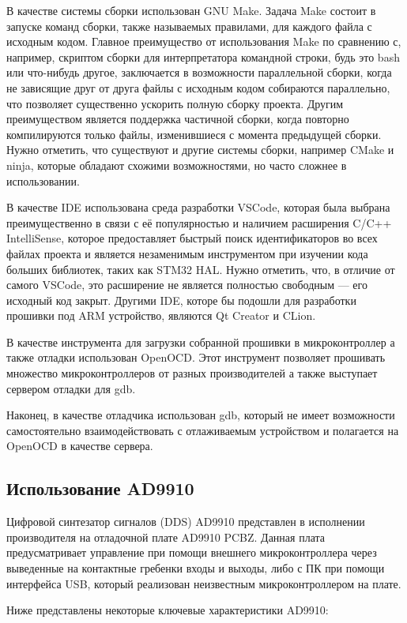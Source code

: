 \documentclass[rusmathsym, eqnumwithinsec, amspack, hyperref]{bomgost}
\begin{document}
В качестве системы сборки использован GNU Make. Задача Make состоит в запуске команд сборки, также называемых правилами, для каждого файла с исходным кодом. Главное преимущество от использования Make по сравнению с, например, скриптом сборки для интерпретатора командной строки, будь это bash или что-нибудь другое, заключается в возможности параллельной сборки, когда не зависящие друг от друга файлы с исходным кодом собираются параллельно, что позволяет существенно ускорить полную сборку проекта. Другим преимуществом является поддержка частичной сборки, когда повторно компилируются только файлы, изменившиеся с момента предыдущей сборки. Нужно отметить, что существуют и другие системы сборки, например CMake и ninja, которые обладают схожими возможностями, но часто сложнее в использовании.

В качестве IDE использована среда разработки VSCode, которая была выбрана преимущественно в связи с её популярностью и наличием расширения C/C++ IntelliSense, которое предоставляет быстрый поиск идентификаторов во всех файлах проекта и является незаменимым инструментом при изучении кода больших библиотек, таких как STM32 HAL. Нужно отметить, что, в отличие от самого VSCode, это расширение не является полностью свободным --- его исходный код закрыт. Другими IDE, которе бы подошли для разработки прошивки под ARM устройство, являются Qt Creator и CLion.

В качестве инструмента для загрузки собранной прошивки в микроконтроллер а также отладки использован OpenOCD. Этот инструмент позволяет прошивать множество микроконтроллеров от разных производителей а также выступает сервером отладки для gdb.

Наконец, в качестве отладчика использован gdb, который не имеет возможности самостоятельно взаимодействовать с отлаживаемым устройством и полагается на OpenOCD в качестве сервера.

\subsection{Использование AD9910}

Цифровой синтезатор сигналов (DDS) AD9910 представлен в исполнении производителя на отладочной плате AD9910 PCBZ. Данная плата предусматривает управление при помощи внешнего микроконтроллера через выведенные на контактные гребенки входы и выходы, либо с ПК при помощи интерфейса USB, который реализован неизвестным микроконтроллером на плате.

Ниже представлены некоторые ключевые характеристики AD9910:
\end{document}
